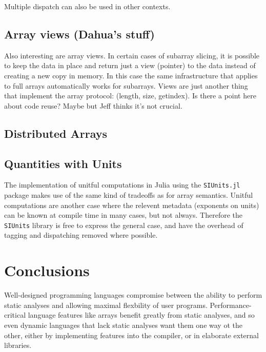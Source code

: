 \documentclass[preprint]{sigplanconf}
\newcommand{\code}[1]{\texttt{#1}}
\begin{document}
Multiple dispatch can also be used in other contexts.

\subsection{Array views (Dahua's stuff)}

Also interesting are array views. In certain cases of subarray slicing, it is
possible to keep the data in place and return just a view (pointer) to the
data instead of creating a new copy in memory. In this case the same
infrastructure that applies to full arrays automatically works for subarrays.
Views are just another thing that implement the array protocol: (length, size,
getindex). Is there a point here about code reuse? Maybe but Jeff thinks it's
not crucial.

\subsection{Distributed Arrays}

\subsection{Quantities with Units}

The implementation of unitful computations in Julia using the
\code{SIUnits.jl}\cite{Fischer:2014si} package makes use of the same kind of
tradeoffs as for array semantics. Unitful computations are another case
where the relevent metadata (exponents on units) can be
known at compile time in many cases, but not always. Therefore the
\code{SIUnits} library is free to express the general case, and have the
overhead of tagging and dispatching removed where possible.



\section{Conclusions}

Well-designed programming languages compromise between the ability to perform
static analyses and allowing maximal flexbility of user programs. Performance-
critical language features like arrays benefit greatly from static analyses,
and so even dynamic languages that lack static analyses want them one way ot
the other, either by implementing features into the compiler, or in elaborate
external libraries.
\end{document}
